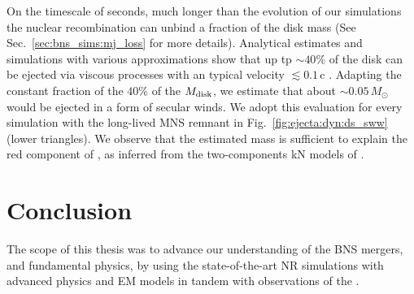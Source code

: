 On the timescale of seconds, much longer than the evolution of our simulations 
the nuclear recombination can unbind a fraction of the disk mass 
(See Sec.~\ref{sec:bns_sims:mj_loss} for more details). %
%
Analytical estimates and simulations with various approximations show that up tp ${\sim}40\%$ 
of the disk can be ejected via viscous processes with an typical velocity ${\lesssim}0.1\,$c
\citep{Lee:2009uc,Fernandez:2015use,Wu:2016pnw,Siegel:2017nub,Fujibayashi:2017puw,Fernandez:2018kax,Radice:2018xqa,Fujibayashi:2020dvr}.
%
Adapting the constant fraction of the $40\%$ of the $M_{\rm disk}$, we estimate 
that about ${\sim}0.05\, M_{\odot}$ would be ejected in a form of 
secular winds. We adopt this evaluation for every simulation with the long-lived 
\ac{MNS} remnant in Fig.~\ref{fig:ejecta:dyn:ds_sww} (lower triangles).
%
We observe that the estimated mass is sufficient to explain the red component of 
\AT{}, as inferred from the two-components \ac{kN} models of \citep{Villar:2017wcc}. 








%
%








\section{Conclusion}



The scope of this thesis was to advance our understanding of the \ac{BNS} mergers,
and fundamental physics, by using the state-of-the-art \ac{NR} simulations with
advanced physics and \ac{EM} models in tandem with \mm{} observations of the 
\GW{}. 




